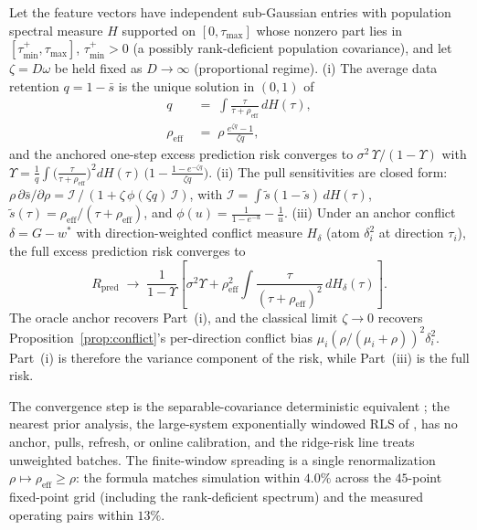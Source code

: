 \documentclass[twoside,11pt]{article}
\begin{document}
\begin{theorem}
\label{thm:rmt}
Let the feature vectors have independent sub-Gaussian entries with population spectral measure $H$ supported on $[0,\tau_{\max}]$ whose nonzero part lies in $[\tau_{\min}^+,\tau_{\max}]$, $\tau_{\min}^+>0$ (a possibly rank-deficient population covariance), and let $\zeta = D \omega$ be held fixed as $D \to\infty$ (proportional regime).
(i) The average data retention $q = 1 - \bar s$ is the unique solution in $(0,1)$ of
\[
\begin{aligned}
q \;&=\; \int \frac{\tau}{\tau + \rho_{\mathrm{eff}}}\, dH(\tau), \\
\rho_{\mathrm{eff}} \;&=\; \rho\,\frac{e^{\zeta q} - 1}{\zeta q},
\end{aligned}
\]
and the anchored one-step excess prediction risk converges to $\sigma^2\, \Upsilon/(1 - \Upsilon)$ with
$\Upsilon = \frac{1}{q}\int \bigl(\frac{\tau}{\tau + \rho_{\mathrm{eff}}}\bigr)^{2} dH(\tau)\,\bigl(1 - \frac{1 - e^{-\zeta q}}{\zeta q}\bigr)$.
(ii) The pull sensitivities are closed form: $\rho\, \partial \bar s / \partial \rho = \mathcal{I}\,/\,(1 + \zeta\,\phi(\zeta q)\,\mathcal{I})$, with $\mathcal{I} = \int \tilde s (1 - \tilde s)\, dH(\tau)$, $\tilde s(\tau) = \rho_{\mathrm{eff}}/(\tau + \rho_{\mathrm{eff}})$, and $\phi(u) = \tfrac{1}{1 - e^{-u}} - \tfrac{1}{u}$.
(iii) Under an anchor conflict $\delta = G - w^*$ with direction-weighted conflict measure $H_\delta$ (atom $\delta_i^2$ at direction $\tau_i$), the full excess prediction risk converges to
\[
R_{\mathrm{pred}} \;\longrightarrow\; \frac{1}{1 - \Upsilon}\left[\sigma^2 \Upsilon + \rho_{\mathrm{eff}}^2 \int \frac{\tau}{(\tau + \rho_{\mathrm{eff}})^2}\, dH_\delta(\tau)\right].
\]
The oracle anchor recovers Part~(i), and the classical limit $\zeta \to 0$ recovers Proposition~\ref{prop:conflict}'s per-direction conflict bias $\mu_i(\rho/(\mu_i+\rho))^2\delta_i^2$. Part~(i) is therefore the variance component of the risk, while Part~(iii) is the full risk.
\end{theorem}
The convergence step is the separable-covariance deterministic equivalent \citep{silverstein1995,rubio2011,hachem2007}; the nearest prior analysis, the large-system exponentially windowed RLS of \citet{xiao2005}, has no anchor, pulls, refresh, or online calibration, and the ridge-risk line \citep{hastie2022} treats unweighted batches.
The finite-window spreading is a single renormalization $\rho \mapsto \rho_{\mathrm{eff}} \ge \rho$: the formula matches simulation within $4.0\%$ across the $45$-point fixed-point grid (including the rank-deficient spectrum) and the measured operating pairs within $13\%$.
\end{document}

